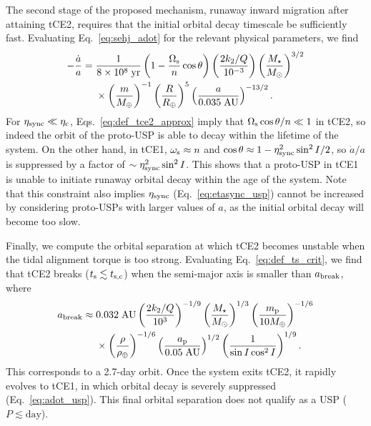 \documentclass[
        fleqn,
        usenatbib,
        referee
    ]{mnras}
\newcommand*{\p}[1]{\left(#1\right)}
\begin{document}
The second stage of the proposed mechanism, runaway inward migration after
attaining tCE2, requires that the initial orbital decay timescale be
sufficiently fast. Evaluating Eq.~\eqref{eq:sehj_adot} for the relevant physical
parameters, we find
\begin{align}
    -\frac{\dot{a}}{a} ={}& \frac{1}{8 \times 10^8\;\mathrm{yr}}
            \p{1 - \frac{\Omega_{\rm s}}{n}\cos \theta}
            \p{\frac{2k_2/Q}{10^{-3}}}
            \p{\frac{M_\star}{M_{\odot}}}^{3/2}\nonumber\\
        &\times \p{\frac{m}{M_{\oplus}}}^{-1}
            \p{\frac{R}{R_{\oplus}}}^5
            \p{\frac{a}{0.035\;\mathrm{AU}}}^{-13/2}.
            \label{eq:adot_usp}
\end{align}
For $\eta_{\rm sync} \ll \eta_{\rm c}$, Eqs.~\eqref{eq:def_tce2_approx} imply
that $\Omega_{\rm s}\cos \theta / n \ll 1$ in tCE2, so indeed the orbit of the
proto-USP is able to decay within the lifetime of the system. On the other hand,
in tCE1, $\omega_{\rm s} \approx n$ and $\cos \theta \approx 1 - \eta_{\rm
sync}^2 \sin^2 I / 2$, so $\dot{a} / a$ is suppressed by a factor of $\sim
\eta_{\rm sync}^2 \sin^2 I$. This shows that a proto-USP in tCE1 is unable to
initiate runaway orbital decay within the age of the system. Note that this
constraint also implies $\eta_{\rm sync}$ (Eq.~\ref{eq:etasync_usp}) cannot be
increased by considering proto-USPs with larger values of $a$, as the initial
orbital decay will become too slow.

Finally, we compute the orbital separation at which tCE2 becomes unstable when
the tidal alignment torque is too strong. Evaluating Eq.~\eqref{eq:def_ts_crit},
we find that tCE2 breaks ($t_{\rm s} \lesssim t_{\rm s, c}$) when the semi-major
axis is smaller than $a_{\rm break}$, where
\begin{align}
    a_{\rm break} \approx{}& 0.032 \;\mathrm{AU}
        \p{\frac{2k_2/Q}{10^{3}}}^{-1/9}
        \p{\frac{M_\star}{M_{\odot}}}^{1/3}
        \p{\frac{m_{\rm p}}{10M_{\oplus}}}^{-1/6}\nonumber\\
        &\times \p{\frac{\rho}{\rho_{\oplus}}}^{-1/6}
        \p{\frac{a_{\rm p}}{0.05\;\mathrm{AU}}}^{1/2}
        \p{\frac{1}{\sin I \cos^2 I}}^{1/9}.
\end{align}
This corresponds to a 2.7-day orbit. Once the system exits tCE2, it rapidly
evolves to tCE1, in which orbital decay is severely suppressed
(Eq.~\ref{eq:adot_usp}). This final orbital separation does not qualify as a USP
($P \lesssim \mathrm{day}$).
\end{document}
